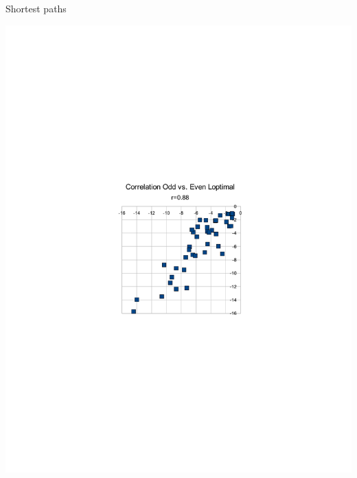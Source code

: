\documentclass[xcolor=table,handout]{beamer}
\begin{document}
\begin{frame}{Shortest paths}
\centerline{
 \includegraphics[trim= 10cm 10cm 10cm 10cm,height=.9\textheight]{loptimal.pdf}}
\end{frame}
\end{document}
